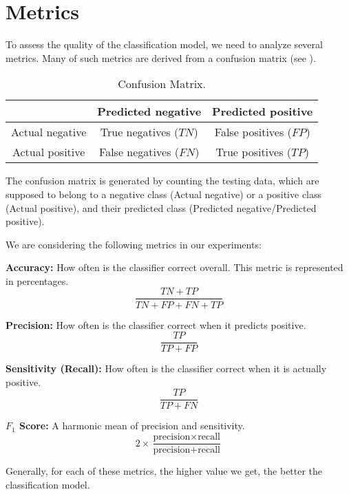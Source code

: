 \section{Metrics}
To assess the quality of the classification model, we need to analyze several metrics. Many of such metrics are derived from a confusion matrix (see ).
\begin{table}[ht]
    \centering
    \begin{tabular}{|c|c|c|}
        \hline
        & Predicted negative & Predicted positive \\
        \hline 
        Actual negative & True negatives ($TN$) & False positives ($FP$) \\
        \hline
        Actual positive & False negatives ($FN$) & True positives ($TP$)  \\
        \hline
    \end{tabular}
    \caption[Confusion Matrix]{Confusion Matrix.}
    \label{tab:confusion_matrix}
\end{table}
The confusion matrix is generated by counting the testing data, which are supposed to belong to a negative class (Actual negative) or a positive class (Actual positive), and their predicted class (Predicted negative/Predicted positive).

We are considering the following metrics in our experiments:
\begin{description}
    \item{\textbf{Accuracy:}} How often is the classifier correct overall. This metric is represented in percentages.
    \begin{equation}
        \frac{TN+TP}{TN+FP+FN+TP}
        \label{eq:svm:accuracy}
    \end{equation}
    \item{\textbf{Precision:}} How often is the classifier correct when it predicts positive.
    \begin{equation}
        \frac{TP}{TP+FP}
        \label{eq:svm:precision}
    \end{equation}
    \item{\textbf{Sensitivity (Recall):}} How often is the classifier correct when it is actually positive.
    \begin{equation}
        \frac{TP}{TP+FN}
        \label{eq:svm:sensitivity}
    \end{equation}
    \item{\textbf{\( F_1 \) Score:}} A harmonic mean of precision and sensitivity.
    \begin{equation}
        2\times\frac{\text{precision}\times\text{recall}}{\text{precision}+\text{recall}}
        \label{eq:svm:F1}
    \end{equation}
\end{description}

Generally, for each of these metrics, the higher value we get, the better the classification model.
